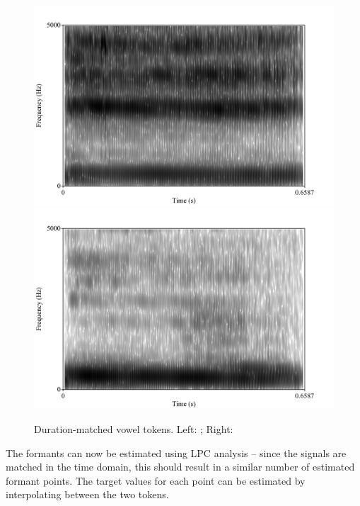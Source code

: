\documentclass{article}\usepackage[]{graphicx}\usepackage[]{color}
\begin{document}
\begin{figure}[!ht]
\centering
\includegraphics[scale=0.3,keepaspectratio]{original_i_token.png}
\includegraphics[scale=0.3,keepaspectratio]{original_u_token.png}
\caption{Duration-matched vowel tokens. Left: \textipa{[i]}; Right: \textipa{[u]}}
\end{figure}
The formants can now be estimated using LPC analysis -- since the signals are matched in the time domain, this should result in a similar number of estimated formant points. The target values for each point can be estimated by interpolating between the two tokens.
\end{document}
